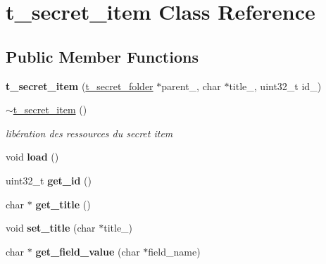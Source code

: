 \hypertarget{classt__secret__item}{}\section{t\+\_\+secret\+\_\+item Class Reference}
\label{classt__secret__item}
\subsection*{Public Member Functions}
\begin{DoxyCompactItemize}
\item 
\mbox{\label{classt__secret__item_acd014169552258a29732afa3a9308167}} 
{\bfseries t\+\_\+secret\+\_\+item} (\hyperlink{classt__secret__folder}{t\+\_\+secret\+\_\+folder} $\ast$parent\+\_\+, char $\ast$title\+\_\+, uint32\+\_\+t id\+\_\+)
\item 
\hyperlink{classt__secret__item_a69e1fb6f4157b29853aea12ea289a435}{$\sim$t\+\_\+secret\+\_\+item} ()
\begin{DoxyCompactList}\small\item\em libération des ressources du secret item \end{DoxyCompactList}\item 
\mbox{\label{classt__secret__item_ae2cdaccb010bbd1e5cc22d51c5824e53}} 
void {\bfseries load} ()
\item 
\mbox{\label{classt__secret__item_adc3aff5b6c522e80331178fa463d9d3e}} 
uint32\+\_\+t {\bfseries get\+\_\+id} ()
\item 
\mbox{\label{classt__secret__item_ab66b556854e321068d7efd28e80d6eb2}} 
char $\ast$ {\bfseries get\+\_\+title} ()
\item 
\mbox{\label{classt__secret__item_a64ba33ef8cff4fe47eb8a7dfc178549a}} 
void {\bfseries set\+\_\+title} (char $\ast$title\+\_\+)
\item 
\mbox{\label{classt__secret__item_ab8077b5045d456bd9e14b275178108eb}} 
char $\ast$ {\bfseries get\+\_\+field\+\_\+value} (char $\ast$field\+\_\+name)
\item 
\mbox{\label{classt__secret__item_ac08ac13960f8a0a45ad50feae91e15ce}} 

\end{DoxyCompactItemize}
